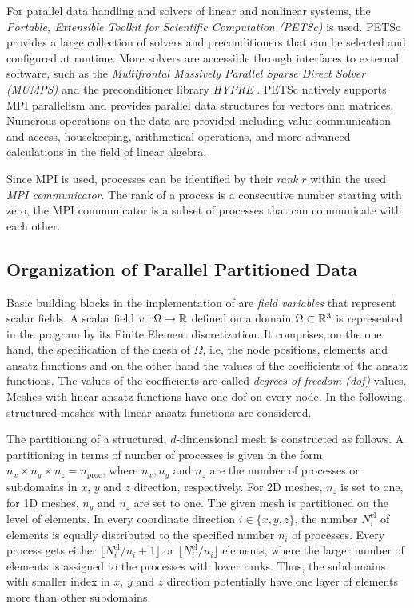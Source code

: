 For parallel data handling and solvers of linear and nonlinear systems, the \emph{Portable, Extensible Toolkit for Scientific Computation (PETSc)} \cite{petsc-web-page,petsc-user-ref,petsc-efficient} is used. PETSc provides a large collection of solvers and preconditioners that can be selected and configured at runtime. More solvers are accessible through interfaces to external software, such as the \emph{Multifrontal Massively Parallel Sparse Direct Solver (MUMPS)} \cite{mumps2001,mumps2019} and the preconditioner library \emph{HYPRE} \cite{falgout2002hypre}. PETSc natively supports MPI parallelism and provides parallel data structures for vectors and matrices. Numerous operations on the data are provided including value communication and access, housekeeping, arithmetical operations, and more advanced calculations in the field of linear algebra.

Since MPI is used, processes can be identified by their \emph{rank} $r$ within the used \emph{MPI communicator}. The rank of a process is a consecutive number starting with zero, the MPI communicator is a subset of processes that can communicate with each other.

\subsection{Organization of Parallel Partitioned Data}

Basic building blocks in the implementation of \opendihu{} are \emph{field variables} that represent scalar fields.
A scalar field $v : \Omega \to \mathbb{R}$ defined on a domain $\Omega \subset \mathbb{R}^3$ is represented in the program by its Finite Element discretization. It comprises, on the one hand, the specification of the mesh of $\Omega$, i.e, the node positions, elements and ansatz functions and on the other hand the values of the coefficients of the ansatz functions. The values of the coefficients are called \emph{degrees of freedom (dof)} values. Meshes with linear ansatz functions have one dof on every node. In the following, structured meshes with linear ansatz functions are considered.

The partitioning of a structured, $d$-dimensional mesh is constructed as follows. A partitioning in terms of number of processes is given in the form $n_x \times n_y \times n_z = n_\text{proc}$, where $n_x,n_y$ and $n_z$ are the number of processes or subdomains in $x$, $y$ and $z$ direction, respectively. For 2D meshes, $n_z$ is set to one, for 1D meshes, $n_y$ and $n_z$ are set to one. The given mesh is partitioned on the level of elements. In every coordinate direction $i \in \{x,y,z\}$, the number $N^\text{el}_i$ of elements is equally distributed to the specified number $n_i$ of processes. Every process gets either $\lfloor N^\text{el}_i/n_i+1\rfloor$ or $\lfloor N^\text{el}_i/n_i \rfloor$ elements, where the larger number of elements is assigned to the processes with lower ranks. Thus, the subdomains with smaller index in $x$, $y$ and $z$ direction potentially have one layer of elements more than other subdomains.

